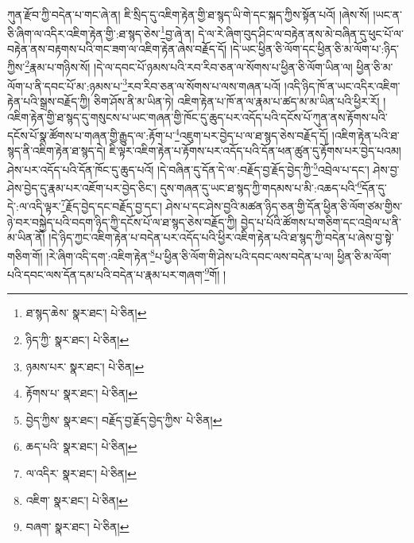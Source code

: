 ཀུན་རྫོབ་ཀྱི་བདེན་པ་གང་ཞེ་ན། ཇི་སྲིད་དུ་འཇིག་རྟེན་གྱི་ཐ་སྙད་ཡི་གེ་དང་སྐད་ཀྱིས་སྟོན་པའོ། །ཞེས་སོ། །ཡང་ན་ཅི་ཞིག་ལ་འདིར་འཇིག་རྟེན་གྱི་:ཐ་སྙད་ཅེས་\footnote{ཐ་སྙད་ཆེས་  སྣར་ཐང་།  པེ་ཅིན། }བྱ་ཞེ་ན། དེ་ལ་རེ་ཞིག་བུད་ཤིང་ལ་བརྟེན་ནས་མེ་བཞིན་དུ་ཕུང་པོ་ལ་བརྟེན་ནས་བརྟགས་པའི་གང་ཟག་ལ་འཇིག་རྟེན་ཞེས་བརྗོད་དོ། །དེ་ཡང་ཕྱིན་ཅི་ལོག་དང་ཕྱིན་ཅི་མ་ལོག་པ་:ཉིད་ཀྱིས་\footnote{ཉིད་ཀྱི་  སྣར་ཐང་།  པེ་ཅིན། }རྣམ་པ་གཉིས་སོ། །དེ་ལ་དབང་པོ་ཉམས་པའི་རབ་རིབ་ཅན་ལ་སོགས་པ་ཕྱིན་ཅི་ལོག་ཡིན་ལ། ཕྱིན་ཅི་མ་ལོག་པ་ནི་དབང་པོ་མ་:ཉམས་པ་\footnote{ཉམས་པར་  སྣར་ཐང་།  པེ་ཅིན། }རབ་རིབ་ཅན་ལ་སོགས་པ་ལས་གཞན་པའོ། །འདི་ཉིད་ཁོ་ན་ཡང་འདིར་འཇིག་རྟེན་པའི་སྒྲས་བརྗོད་ཀྱི། ཅིག་ཤོས་ནི་མ་ཡིན་ཏེ། འཇིག་རྟེན་པ་ཁོ་ན་ལ་རྣམ་པ་ཚད་མ་མ་ཡིན་པའི་ཕྱིར་རོ། །འཇིག་རྟེན་གྱི་ཐ་སྙད་དུ་གསུངས་པ་ཡང་གཞན་གྱི་ཁོང་དུ་ཆུད་པར་འདོད་པའི་དངོས་པོ་ཀུན་ནས་རྟོགས་པའི་དངོས་པོ་སྣ་ཚོགས་པ་གཞན་གྱི་རྒྱུད་ལ་:རྟོག་པ་\footnote{རྟོགས་པ་  སྣར་ཐང་།  པེ་ཅིན། }འཇུག་པར་བྱེད་པ་ལ་ཐ་སྙད་ཅེས་བརྗོད་དོ། །འཇིག་རྟེན་པའི་ཐ་སྙད་ནི་འཇིག་རྟེན་ཐ་སྙད་དེ། ཇི་ལྟར་འཇིག་རྟེན་པ་རྟོགས་པར་འདོད་པའི་དོན་ཕན་ཚུན་དུ་རྟོགས་པར་བྱེད་པའམ། ཤེས་པར་འདོད་པའི་དོན་ཁོང་དུ་ཆུད་པའོ། །དེ་བཞིན་དུ་དོན་དེ་ལ་:བརྗོད་བྱ་རྗོད་བྱེད་ཀྱི་\footnote{བྱེད་ཀྱིས་  སྣར་ཐང་། བརྗོད་བྱ་རྗོད་བྱེད་ཀྱིས་  པེ་ཅིན། }འབྲེལ་པ་དང་། ཤེས་བྱ་ཤེས་བྱེད་དུ་རྣམ་པར་འཇོག་པར་བྱེད་ཅིང་། དུས་གཞན་དུ་ཡང་ཐ་སྙད་ཀྱི་གདམས་པ་མི་:འཆད་པའི་\footnote{ཆད་པའི་  སྣར་ཐང་།  པེ་ཅིན། }དོན་དུ་དེ་:ལ་འདི་ལྟར་\footnote{ལ་འདིར་  སྣར་ཐང་།  པེ་ཅིན། }རྗོད་བྱེད་དང་བརྗོད་བྱ་དང་། ཤེས་པ་དང་ཤེས་བྱའི་མཚན་ཉིད་ཅན་གྱི་དོན་ཕྱིན་ཅི་ལོག་ཙམ་གྱིས་ཉེ་བར་བསྐྱེད་པའི་བདག་ཉིད་ཀྱི་དངོས་པོ་ལ་ཐ་སྙད་ཅེས་བརྗོད་ཀྱི། བྱེད་པ་པོའི་ཚོགས་པ་གཅིག་དང་འབྲེལ་པ་ནི་མ་ཡིན་ནོ། །དེ་ཉིད་ཀྱང་འཇིག་རྟེན་པ་བདེན་པར་འདོད་པའི་ཕྱིར་འཇིག་རྟེན་པའི་ཐ་སྙད་ཀྱི་བདེན་པ་ཞེས་བྱ་སྟེ་གཅིག་གོ། །རེ་ཞིག་འདི་དག་:འཇིག་རྟེན་\footnote{འཇིག་  སྣར་ཐང་།  པེ་ཅིན། }པ་ཕྱིན་ཅི་ལོག་གི་ཤེས་པའི་དབང་ལས་བདེན་པ་ལ། ཕྱིན་ཅི་མ་ལོག་པའི་དབང་ལས་དོན་དམ་པའི་བདེན་པ་རྣམ་པར་གཞག་\footnote{བཞག་  སྣར་ཐང་།  པེ་ཅིན། }གོ། །
